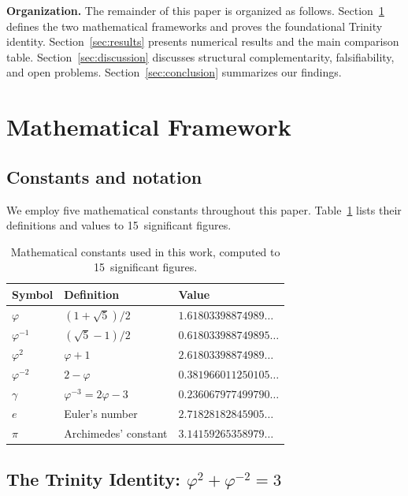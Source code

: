 \documentclass[11pt,a4paper]{article}
\newcommand{\vp}{\varphi}
\begin{document}
\medskip
\noindent\textbf{Organization.} The remainder of this paper is organized as
follows. Section~\ref{sec:framework} defines the two mathematical frameworks
and proves the foundational Trinity identity. Section~\ref{sec:results}
presents numerical results and the main comparison table.
Section~\ref{sec:discussion} discusses structural complementarity,
falsifiability, and open problems. Section~\ref{sec:conclusion} summarizes
our findings.

\section{Mathematical Framework}\label{sec:framework}

\subsection{Constants and notation}\label{sec:notation}

We employ five mathematical constants throughout this paper.
Table~\ref{tab:constants} lists their definitions and values to 15~significant
figures.

\begin{table}[H]
\centering
\caption{Mathematical constants used in this work, computed to
  15~significant figures.}
\label{tab:constants}
\begin{tabular}{lll}
\toprule
Symbol & Definition & Value \\
\midrule
$\vp$       & $(1+\sqrt{5})/2$       & $1.61803398874989\ldots$ \\
$\vp^{-1}$  & $(\sqrt{5}-1)/2$       & $0.618033988749895\ldots$ \\
$\vp^{2}$   & $\vp+1$                & $2.61803398874989\ldots$ \\
$\vp^{-2}$  & $2-\vp$                & $0.381966011250105\ldots$ \\
$\gamma$    & $\vp^{-3} = 2\vp-3$    & $0.236067977499790\ldots$ \\
$e$          & Euler's number         & $2.71828182845905\ldots$ \\
$\pi$        & Archimedes' constant   & $3.14159265358979\ldots$ \\
\bottomrule
\end{tabular}
\end{table}

\subsection{The Trinity Identity: $\vp^{2}+\vp^{-2}=3$}\label{sec:identity}
\end{document}
